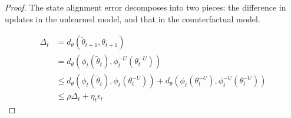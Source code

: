 \documentclass[10pt,a4paper]{amsart}
\begin{document}
\begin{proof}
The state alignment error decomposes into two pieces: the difference in updates in the unlearned model, and that in the counterfactual model.

\begin{align*}
  \Delta_t &= d_\theta(\tilde \theta_{t+1}, \theta_{t+1}) \\
    &= d_{\theta}(\phi_t(\tilde \theta_t), \phi_t^{-U}(\theta_t^{-U})) \\
    &\leq d_{\theta}(\phi_t(\tilde \theta_t), \phi_t(\theta_{t}^{-U})) + d_{\theta}(\phi_t(\theta_t^{-U}), \phi_t^{-U}(\theta_{t}^{-U})) \\
    &\leq \rho \Delta_t + \eta_t \epsilon_t
\end{align*}
\end{proof}
\end{document}
